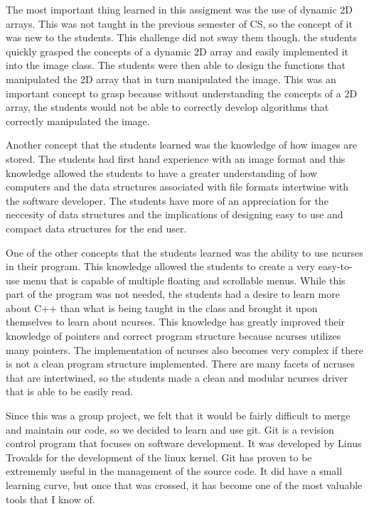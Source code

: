 \documentclass[pdftex, 11pt]{article}
\begin{document}
The most important thing learned in this assigment was the use of dynamic 2D arrays. This was not taught in the previous
semester of CS, so the concept of it was new to the students. This challenge did not sway them though. the students
quickly grasped the concepts of a dynamic 2D array and easily implemented it into the image class. The students were
then able to design the functions that manipulated the 2D array that in turn manipulated the image. This was an
important concept to grasp because without understanding the concepts of a 2D array, the students would not be able to
correctly develop algorithms that correctly manipulated the image. 

Another concept that the students learned was the knowledge of how images are stored. The students had first hand
experience with an image format and this knowledge allowed the students to have a greater understanding of how computers
and the data structures associated with file formats intertwine with the software developer. The students have more of
an appreciation for the neccesity of data structures and the implications of designing easy to use and compact data
structures for the end user. 

One of the other concepts that the students learned was the ability to use ncurses in their program. This knowledge
allowed the students to create a very easy-to-use menu that is capable of multiple floating and scrollable menus. While
this part of the program was not needed, the students had a desire to learn more about C++ than what is being taught in
the class and brought it upon themselves to learn about ncurses. This knowledge has greatly improved their knowledge of
pointers and correct program structure because ncurses utilizes many pointers. The implementation of ncurses also becomes
very complex if there is not a clean program structure implemented. There are many facets of ncruses that are
intertwined, so the students made a clean and modular ncurses driver that is able to be easily read.

Since this was a group project, we felt that it would be fairly difficult to merge and maintain our code, so we decided
to learn and use git. Git is a revision control program that focuses on software development. It was developed by Linus
Trovalds for the development of the linux kernel. Git has proven to be extrememly useful in the management of the source
code. It did have a small learning curve, but once that was crossed, it has become one of the most valuable tools that I
know of.
\end{document}
